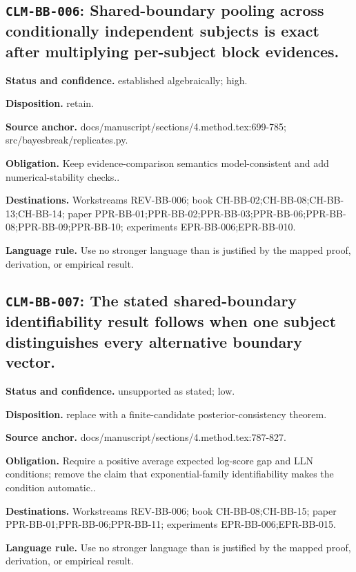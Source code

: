 \subsection[\texttt{CLM-BB-006}]{\texttt{CLM-BB-006}: Shared-boundary pooling across conditionally independent subjects is exact after multiplying per-subject block evidences.}
\textbf{Status and confidence.} established algebraically; high.\par
\textbf{Disposition.} retain.\par
\textbf{Source anchor.} docs/manuscript/sections/4.method.tex:699-785; src/bayesbreak/replicates.py.\par
\textbf{Obligation.} Keep evidence-comparison semantics model-consistent and add numerical-stability checks..\par
\textbf{Destinations.} Workstreams REV-BB-006; book CH-BB-02;CH-BB-08;CH-BB-13;CH-BB-14; paper PPR-BB-01;PPR-BB-02;PPR-BB-03;PPR-BB-06;PPR-BB-08;PPR-BB-09;PPR-BB-10; experiments EPR-BB-006;EPR-BB-010.\par
\textbf{Language rule.} Use no stronger language than is justified by the mapped proof, derivation, or empirical result.

\subsection[\texttt{CLM-BB-007}]{\texttt{CLM-BB-007}: The stated shared-boundary identifiability result follows when one subject distinguishes every alternative boundary vector.}
\textbf{Status and confidence.} unsupported as stated; low.\par
\textbf{Disposition.} replace with a finite-candidate posterior-consistency theorem.\par
\textbf{Source anchor.} docs/manuscript/sections/4.method.tex:787-827.\par
\textbf{Obligation.} Require a positive average expected log-score gap and LLN conditions; remove the claim that exponential-family identifiability makes the condition automatic..\par
\textbf{Destinations.} Workstreams REV-BB-006; book CH-BB-08;CH-BB-15; paper PPR-BB-01;PPR-BB-06;PPR-BB-11; experiments EPR-BB-006;EPR-BB-015.\par
\textbf{Language rule.} Use no stronger language than is justified by the mapped proof, derivation, or empirical result.

